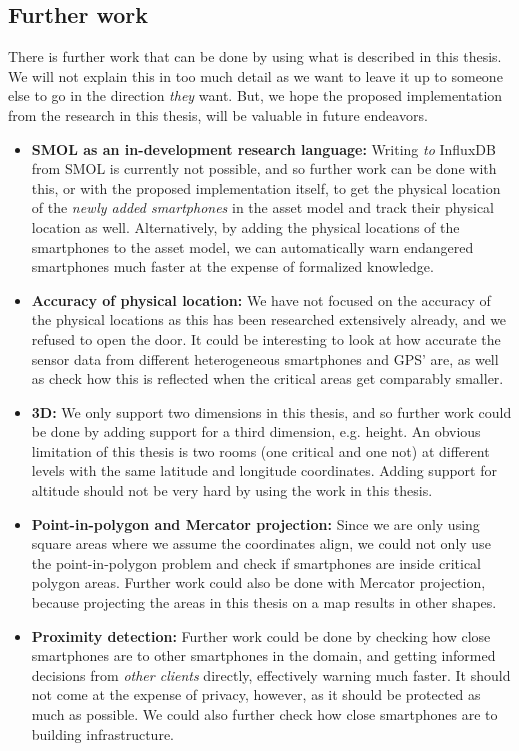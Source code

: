 \documentclass{article}
\begin{document}
\subsection{Further work}
There is further work that can be done by using what is described in this thesis. We will not explain this in too much detail as we want to leave it up to someone else to go in the direction \emph{they} want. But, we hope the proposed implementation from the research in this thesis, will be valuable in future endeavors.

\begin{itemize}
    \item \textbf{SMOL as an in-development research language:} Writing \emph{to} InfluxDB from SMOL is currently not possible, and so further work can be done with this, or with the proposed implementation itself, to get the physical location of the \emph{newly added smartphones} in the asset model and track their physical location as well. Alternatively, by adding the physical locations of the smartphones to the asset model, we can automatically warn endangered smartphones much faster at the expense of formalized knowledge.
    \item \textbf{Accuracy of physical location:} We have not focused on the accuracy of the physical locations as this has been researched extensively already, and we refused to open the door. It could be interesting to look at how accurate the sensor data from different heterogeneous smartphones and GPS' are, as well as check how this is reflected when the critical areas get comparably smaller.
    \item \textbf{3D:} We only support two dimensions in this thesis, and so further work could be done by adding support for a third dimension, e.g. height. An obvious limitation of this thesis is two rooms (one critical and one not) at different levels with the same latitude and longitude coordinates. Adding support for altitude should not be very hard by using the work in this thesis.
    \item \textbf{Point-in-polygon and Mercator projection:} Since we are only using square areas where we assume the coordinates align, we could not only use the point-in-polygon problem and check if smartphones are inside critical polygon areas. Further work could also be done with Mercator projection, because projecting the areas in this thesis on a map results in other shapes.
    \item \textbf{Proximity detection:} Further work could be done by checking how close smartphones are to other smartphones in the domain, and getting informed decisions from \emph{other clients} directly, effectively warning much faster. It should not come at the expense of privacy, however, as it should be protected as much as possible. We could also further check how close smartphones are to building infrastructure.

\end{itemize}
\end{document}
